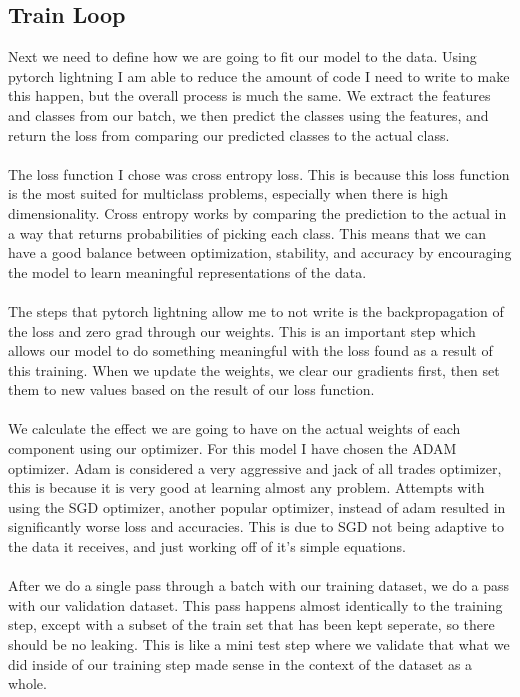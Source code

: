 \documentclass[12pt,a4paper]{article}
\begin{document}
    \subsection{Train Loop}
    Next we need to define how we are going to fit our model to the data. Using pytorch lightning I am able
    to reduce the amount of code I need to write to make this happen, but the overall process is much the same.
    We extract the features and classes from our batch, we then predict the classes using the features, and return
    the loss from comparing our predicted classes to the actual class. 
    \\
    \\
    The loss function I chose was cross entropy loss.
    This is because this loss function is the most suited for multiclass problems, especially when there is high dimensionality.
    Cross entropy works by comparing the prediction to the actual in a way that returns probabilities of picking each
    class. This means that we can have a good balance between optimization, stability, and accuracy by encouraging
    the model to learn meaningful representations of the data.
    \\
    \\
    The steps that pytorch lightning allow me to not write is the backpropagation of the loss and zero grad
    through our weights. This is an important step which allows our model to do something meaningful with 
    the loss found as a result of this training. When we update the weights, we clear our gradients first, 
    then set them to new values based on the result of our loss function.
    \\
    \\
    We calculate the effect we are going to have on the actual weights of each component using our optimizer.
    For this model I have chosen the ADAM optimizer. Adam is considered a very aggressive and jack of all
    trades optimizer, this is because it is very good at learning almost any problem. Attempts with using
    the SGD optimizer, another popular optimizer, instead of adam resulted in significantly worse loss and
    accuracies. This is due to SGD not being adaptive to the data it receives, and just working off of it's 
    simple equations.
    \\
    \\
    After we do a single pass through a batch with our training dataset, we do a pass with our validation dataset.
    This pass happens almost identically to the training step, except with a subset of the train set that has been
    kept seperate, so there should be no leaking. This is like a mini test step where we validate that what we did 
    inside of our training step made sense in the context of the dataset as a whole.
\end{document}
